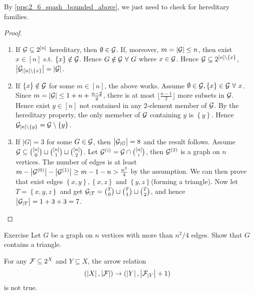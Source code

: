 \begin{remark}
    By \cref{pps:2_6_sqash_bounded_above}, we just need to check for hereditary families. 
\end{remark}

\begin{proof}
    \begin{enumerate}
        \item If $\mathcal{G}\subseteq 2^{[n]}$ hereditary, then $\emptyset \in \mathcal{G}$. If, moreover, $m=\left|\mathcal{G}\right|\leq n$, then exist $x\in [n]$ s.t. $\left\{x\right\}\notin \mathcal{G}$. Hence $G\notin \mathcal{G}\ \forall\ G$ where $x\in \mathcal{G}$. Hence $\mathcal{G}\subseteq 2^{[n]\setminus \left\{x\right\}}$, $\left|\mathcal{G}_{|[n]\setminus \left\{x\right\}}\right|=\left|\mathcal{G}\right|$.
        \item If $\left\{x\right\}\notin \mathcal{G}$ for some $m\in [n]$, the above works. Assume $\emptyset \in \mathcal{G}, \left\{x\right\}\in \mathcal{G}\ \forall\ x$. Since $m=\left|\mathcal{G}\right|\leq 1+n+\frac{n-2}{2}$, there is at most $\lfloor \frac{n-1}{2}\rfloor$ more subsets in $\mathcal{G}$. Hence exist $y\in [n]$ not contained in any $2$-element member of $\mathcal{G}$. By the hereditary property, the only memeber of $\mathcal{G}$ containing $y$ is $\left\{y\right\}$. Hence $\mathcal{G}_{[n]\setminus \left\{y\right\}}=\mathcal{G}\setminus \left\{y\right\}$.
        \item If $\left|G\right|=3$ for some $G\in \mathcal{G}$, then $\left|\mathcal{G}_{|G}\right|=8$ and the result follows. Assume $\mathcal{G}\subseteq {[n]\choose 0}\sqcup{[n]\choose 1}\sqcup{[n]\choose 2}$. Let $\mathcal{G}^{(i)}=\mathcal{G}\cap {[n]\choose i}$, then $\mathcal{G}^{(2)}$ is a graph on $n$ vertices. The number of edges is at least $m-\left|\mathcal{G}^{(0)}\right|-\left|\mathcal{G}^{(1)}\right|\geq m-1-n>\frac{n^2}{4}$ by the assumption. We can then prove that exist edges $\left\{x,y\right\},\left\{x,z\right\}$ and $\left\{y,z\right\}$(forming a triangle). Now let $T=\left\{x,y,z\right\}$ and get $\mathcal{G}_{|T}={T\choose 0}\sqcup{T\choose 1}\sqcup{T\choose 2}$, and hence $\left|\mathcal{G}_{|T}\right|=1+3+3=7$.
    \end{enumerate}
\end{proof}

\begin{newenv}[rnd:]{}{Exercise}
    Let $G$ be a graph on $n$ vertices with more than $n^2/4$ edges. Show that $G$ contains a triangle.
\end{newenv}

\begin{corollary}[crl:]{}
    For any $\mathcal{F}\subseteq 2^X$ and $Y\subseteq X$, the arrow relation
    \[(\left|X\right|,\left|\mathcal{F}\right|)\rightarrow (\left|Y\right|,\left|\mathcal{F}_{|Y}\right|+1)\]
    is not true.
\end{corollary}

